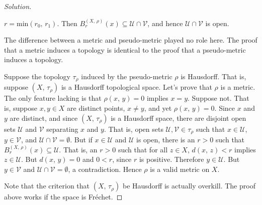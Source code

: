 \documentclass{article}
\theoremstyle{normal}
\begin{document}
\begin{proof}[Solution]
\begin{itemize}
                $r=\textrm{min}(r_{0},\,r_{1})$. Then
                $B_{r}^{(X,\,\rho)}(x)\subseteq\mathcal{U}\cap\mathcal{V}$, and
                hence $\mathcal{U}\cap\mathcal{V}$ is open.
        \end{itemize}
        The difference between a metric and pseudo-metric played no role here.
        The proof that a metric induces a topology is identical to the proof
        that a pseudo-metric induces a topology.
        \par\hfill\par
        Suppose the topology $\tau_{\rho}$ induced by the pseudo-metric
        $\rho$ is Hausdorff. That is, suppose $(X,\,\tau_{\rho})$ is a
        Hausdorff topological space. Let's prove that $\rho$ is a metric. The
        only feature lacking is that $\rho(x,\,y)=0$ implies $x=y$. Suppose not.
        That is, suppose $x,y\in{X}$ are distinct points, $x\ne{y}$, and yet
        $\rho(x,\,y)=0$. Since $x$ and $y$ are distinct, and since
        $(X,\,\tau_{\rho})$ is a Hausdorff space, there are disjoint open sets
        $\mathcal{U}$ and $\mathcal{V}$ separating $x$ and $y$. That is, open
        sets $\mathcal{U},\mathcal{V}\in\tau_{\rho}$ such that
        $x\in\mathcal{U}$, $y\in\mathcal{V}$, and
        $\mathcal{U}\cap\mathcal{V}=\emptyset$. But if $x\in\mathcal{U}$ and
        $\mathcal{U}$ is open, there is an $r>0$ such that
        $B_{r}^{(X,\,\rho)}(x)\subseteq\mathcal{U}$. That is, an $r>0$ such
        that for all $z\in{X}$, $d(x,\,z)<r$ implies $z\in\mathcal{U}$. But
        $d(x,\,y)=0$ and $0<r$, since $r$ is positive. Therefore
        $y\in\mathcal{U}$. But $y\in\mathcal{V}$ and
        $\mathcal{U}\cap\mathcal{V}=\emptyset$, a contradiction. Hence
        $\rho$ is a valid metric on $X$.
        \par\hfill\par
        Note that the criterion that $(X,\,\tau_{\rho})$ be Hausdorff is
        actually overkill. The proof above works if the space is
        Fr\'{e}chet.
    \end{proof}
    \newpage
    \color{blue}
\end{document}
